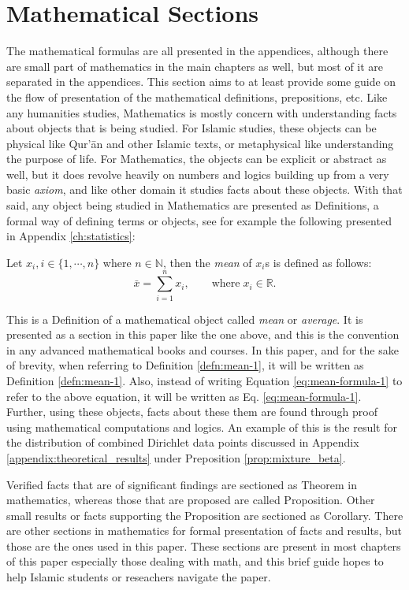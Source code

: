 \section{Mathematical Sections}
The mathematical formulas are all presented in the appendices, although there are small part of mathematics in the main chapters as well, but most of it are separated in the appendices. This section aims to at least provide some guide on the flow of presentation of the mathematical definitions, prepositions, etc. Like any humanities studies, Mathematics is mostly concern with understanding facts about objects that is being studied. For Islamic studies, these objects can be physical like Qur'\=an and other Islamic texts, or metaphysical like understanding the purpose of life. For Mathematics, the objects can be explicit or abstract as well, but it does revolve heavily on numbers and logics building up from a very basic \textit{axiom}, and like other domain it studies facts about these objects. With that said, any object being studied in Mathematics are presented as Definitions, a formal way of defining terms or objects, see for example the following presented in Appendix \ref{ch:statistics}:
\begin{defn}[Mean]\label{defn:mean-1}
Let $x_i, i\in\{1,\cdots,n\}$ where $n\in\mathbb{N}$, then the \textit{mean} of $x_i$s is defined as follows:
\begin{equation}\label{eq:mean-formula-1}
    \bar{x} = \sum_{i=1}^n x_i, \qquad\text{where}\;x_i \in\mathbb{R}.
\end{equation}
\end{defn}
This is a Definition of a mathematical object called \textit{mean} or \textit{average}. It is presented as a section in this paper like the one above, and this is the convention in any advanced mathematical books and courses. In this paper, and for the sake of brevity, when referring to Definition \ref{defn:mean-1}, it will be written as Definition \ref{defn:mean-1}. Also, instead of writing Equation \ref{eq:mean-formula-1} to refer to the above equation, it will be written as Eq. \ref{eq:mean-formula-1}. Further, using these objects, facts about these them are found through proof using mathematical computations and logics. An example of this is the result for the distribution of combined Dirichlet data points discussed in Appendix \ref{appendix:theoretical_results} under Preposition \ref{prop:mixture_beta}.

Verified facts that are of significant findings are sectioned as Theorem in mathematics, whereas those that are proposed are called Proposition. Other small results or facts supporting the Proposition are sectioned as Corollary. There are other sections in mathematics for formal presentation of facts and results, but those are the ones used in this paper. These sections are present in most chapters of this paper especially those dealing with math, and this brief guide hopes to help Islamic students or reseachers navigate the paper.